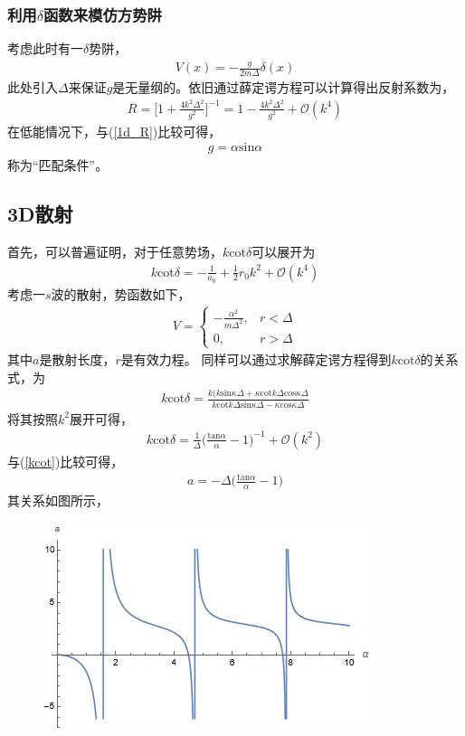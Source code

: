\documentclass[aps,tightenlines,16pt]{ctexart}
\numberwithin{equation}{section}
\begin{document}
\subsubsection{利用$\delta$函数来模仿方势阱}

考虑此时有一$\delta$势阱，
\begin{align}
   V(x)=-\frac{g}{2m\Delta}\delta(x)
\end{align}
此处引入$\Delta$来保证$g$是无量纲的。依旧通过薛定谔方程可以计算得出反射系数为，
\begin{align}
   R=\Big[1+\frac{4k^2\Delta^2}{g^2}\Big]^{-1}=1-\frac{4k^2\Delta^2}{g^2}+\mathcal{O}(k^4)
\end{align}
在低能情况下，与(\ref{1d_R})比较可得，
\begin{align}
   g=\alpha \mbox{sin}\alpha
\end{align}
称为“匹配条件”。

\subsection{3D散射}
首先，{\color{red}可以普遍证明}，对于任意势场，$k\mbox{cot}\delta$可以展开为
\begin{align}\label{kcot}
   k\mbox{cot}\delta=-\frac{1}{a_0}+\frac{1}{2}r_0 k^2+\mathcal{O}(k^4)
\end{align}
考虑一$s$波的散射，势函数如下，
\begin{align}
   V=\begin{cases}
      -\frac{\alpha^2}{m\Delta^2},& r < \Delta \\
          0, & r > \Delta
   \end{cases}
\end{align}
其中$a$是散射长度，$r$是有效力程。
同样可以通过求解薛定谔方程得到$k\mbox{cot}\delta$的关系式，为
\begin{align}
      k\mbox{cot}\delta=\frac{k(k\mbox{sin}\kappa\Delta+\kappa\mbox{cot}k\Delta\mbox{cos}\kappa\Delta}{k\mbox{cot}k\Delta\mbox{sin}\kappa\Delta-\kappa\mbox{cos}\kappa\Delta}
\end{align}
将其按照$k^2$展开可得，
\begin{align}
   k\mbox{cot}\delta=\frac{1}{\Delta}\Big(\frac{\mbox{tan}\alpha}{\alpha}-1\Big)^{-1}+\mathcal{O}(k^2)
\end{align}
与(\ref{kcot})比较可得，
\begin{align}\label{3d_m}
   a=-\Delta\Big(\frac{\mbox{tan}\alpha}{\alpha}-1\Big)
\end{align}
其关系如图所示，
\begin{figure}[h]\centering
   \renewcommand{\figurename}{图}
   \includegraphics{3d_scattering.jpg}
\end{figure}
\end{document}
